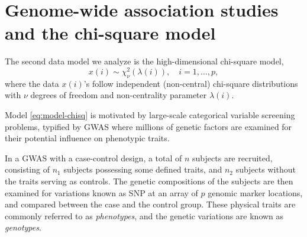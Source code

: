 \section{Genome-wide association studies and the chi-square model}
\label{sec:motivation-chisq}

The second data model we analyze is the high-dimensional chi-square model,
\begin{equation} \label{eq:model-chisq}
    x(i) \sim \chi_\nu^2\left(\lambda(i)\right), \quad i=1,\ldots,p,
\end{equation}
where the data $x(i)$'s follow independent (non-central) chi-square distributions with $\nu$ degrees of freedom and non-centrality parameter $\lambda(i)$.


Model \eqref{eq:model-chisq} is motivated by large-scale categorical variable screening problems, typified by \ac{GWAS}
where millions of genetic factors are examined for their potential influence on phenotypic traits.

% 
In a GWAS with a case-control design, a total of $n$ subjects are recruited,  consisting of $n_1$ subjects possessing some defined traits, and $n_2$ subjects without the traits serving as controls.
The genetic compositions of the subjects are then examined for variations known as \ac{SNP} at an array of $p$ genomic marker locations, and compared between the case and the control group.
These physical traits are commonly referred to as \emph{phenotypes}, and the genetic variations are known as \emph{genotypes}.

